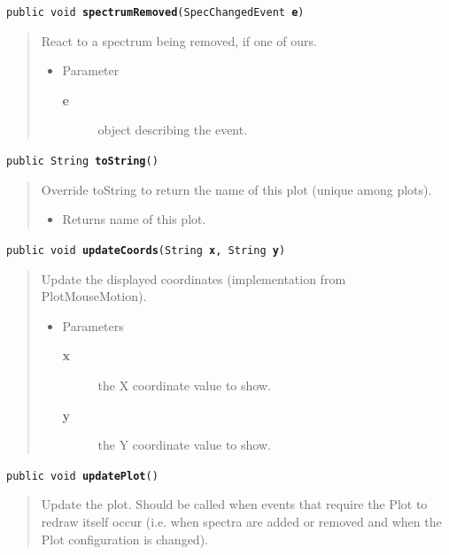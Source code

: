 \documentclass[twoside,11pt]{article}
\renewcommand{\_}{\texttt{\symbol{95}}}
\newcommand{\method}[1]{\texttt{#1}}
\newenvironment{desc}{\begin{quote}}{\end{quote}}
\begin{document}
\method{public void \textbf{spectrumRemoved}(\texttt{SpecChangedEvent} \textbf{e})\label{l222}\label{l223}}
\begin{desc}React to a spectrum being removed, if one of ours.
\begin{itemize}
\item{Parameter
  \begin{description}
   \item[\textbf{e}]{object describing the event.}
  \end{description}}
\end{itemize}
\end{desc}

\method{public String \textbf{toString}()\label{l224}\label{l225}}
\begin{desc}Override toString to return the name of this plot (unique
 among plots).
\begin{itemize}
\item{Returns name of this plot. }
\end{itemize}
\end{desc}

\method{public void \textbf{updateCoords}(\texttt{String} \textbf{x}, \texttt{String} \textbf{y})\label{l226}\label{l227}}
\begin{desc}Update the displayed coordinates (implementation from PlotMouseMotion).
\begin{itemize}
\item{Parameters
  \begin{description}
   \item[\textbf{x}]{the X coordinate value to show.}
   \item[\textbf{y}]{the Y coordinate value to show.}
  \end{description}}
\end{itemize}
\end{desc}

\method{public void \textbf{updatePlot}()\label{l228}\label{l229}}
\begin{desc}Update the plot. Should be called when events that require the
 Plot to redraw itself occur (i.e. when spectra are added or
 removed and when the Plot configuration is changed).
\end{desc}
\end{document}
